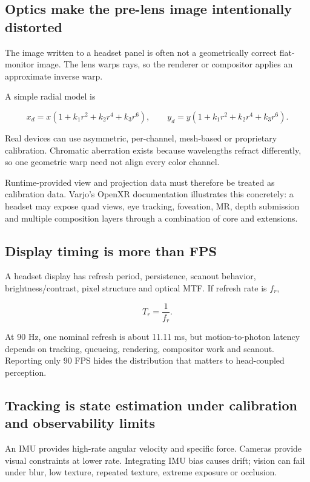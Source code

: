 \subsection{Optics make the pre-lens image intentionally distorted}\label{optics-make-the-pre-lens-image-intentionally-distorted}

The image written to a headset panel is often not a geometrically correct flat-monitor image. The lens warps rays, so the renderer or compositor applies an approximate inverse warp.

A simple radial model is

\[
x_d=x(1+k_1r^2+k_2r^4+k_3r^6), \qquad
y_d=y(1+k_1r^2+k_2r^4+k_3r^6).
\]

Real devices can use asymmetric, per-channel, mesh-based or proprietary calibration. Chromatic aberration exists because wavelengths refract differently, so one geometric warp need not align every color channel.

Runtime-provided view and projection data must therefore be treated as calibration data. Varjo's OpenXR documentation illustrates this concretely: a headset may expose quad views, eye tracking, foveation, MR, depth submission and multiple composition layers through a combination of core and extensions.

\subsection{Display timing is more than FPS}\label{display-timing-is-more-than-fps}

A headset display has refresh period, persistence, scanout behavior, brightness/contrast, pixel structure and optical MTF. If refresh rate is \(f_r\),

\[
T_r=\frac{1}{f_r}.
\]

At 90 Hz, one nominal refresh is about 11.11 ms, but motion-to-photon latency depends on tracking, queueing, rendering, compositor work and scanout. Reporting only 90 FPS hides the distribution that matters to head-coupled perception.

\subsection{Tracking is state estimation under calibration and observability limits}\label{tracking-is-state-estimation-under-calibration-and-observability-limits}

An IMU provides high-rate angular velocity and specific force. Cameras provide visual constraints at lower rate. Integrating IMU bias causes drift; vision can fail under blur, low texture, repeated texture, extreme exposure or occlusion.

